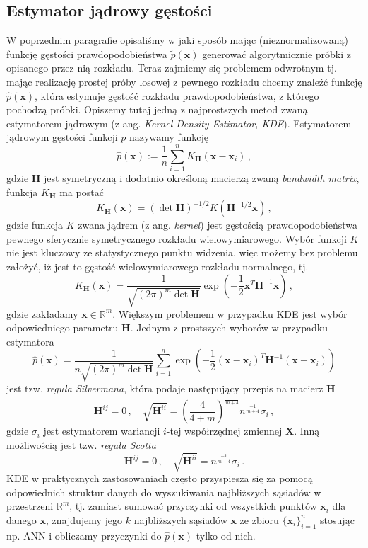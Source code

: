 \documentclass{myclass}
\numberwithin{equation}{subsection}
\begin{document}
\subsection{Estymator jądrowy gęstości}

W poprzednim paragrafie opisaliśmy w jaki sposób mając (nieznormalizowaną) funkcję gęstości
prawdopodobieństwa \(\tilde{p}(\bm{x})\) generować algorytmicznie próbki z opisanego przez nią
rozkładu. Teraz zajmiemy się problemem odwrotnym tj. mając realizację prostej próby losowej z
pewnego rozkładu chcemy znaleźć funkcję \(\hat{p}(\bm{x})\), która estymuje gęstość rozkładu
prawdopodobieństwa, z którego pochodzą próbki. Opiszemy tutaj jedną z najprostszych metod zwaną
estymatorem jądrowym (z ang. \textit{Kernel Density Estimator, KDE}). Estymatorem jądrowym gęstości
funkcji \(p\) nazywamy funkcję
\[
\hat{p}(\bm{x}) := \frac{1}{n}\sum_{i=1}^n K_{\bm{H}}(\bm{x} - \bm{x}_i)\,,
\]
gdzie \(\bm{H}\) jest symetryczną i dodatnio określoną macierzą zwaną \textit{bandwidth matrix},
funkcja \(K_{\bm{H}}\) ma postać
\[
K_{\bm{H}}(\bm{x}) = (\det \bm{H})^{-1/2} K(\bm{H}^{-1/2}\bm{x})\,,
\]
gdzie funkcja \(K\) zwana jądrem (z ang. \textit{kernel}) jest gęstością prawdopodobieństwa pewnego
sferycznie symetrycznego rozkładu wielowymiarowego. Wybór funkcji \(K\) nie jest kluczowy ze
statystycznego punktu widzenia, więc możemy bez problemu założyć, iż jest to gęstość
wielowymiarowego rozkładu normalnego, tj.
\[
K_{\bm{H}}(\bm{x}) = \frac{1}{\sqrt{(2\pi)^m \det\bm{H}}} \exp\left(-\frac{1}{2} \bm{x}^T\bm{H}^{-1}\bm{x}\right)\,,
\]
gdzie zakładamy \(\bm{x} \in \mathbb{R}^m\). Większym problemem w przypadku KDE jest wybór
odpowiedniego parametru \(\bm{H}\). Jednym z prostszych wyborów w przypadku estymatora
\[
\boxed{
\hat{p}(\bm{x}) = \frac{1}{n\sqrt{(2\pi)^m \det\bm{H}}} \sum_{i=1}^n \exp\left(-\frac{1}{2} (\bm{x} - \bm{x}_i)^T\bm{H}^{-1}(\bm{x} - \bm{x}_i)\right)
}
\]
jest tzw. \emph{reguła Silvermana}, która podaje następujący przepis na macierz \(\bm{H}\)
\[
\bm{H}^{ij} = 0\,,\quad \sqrt{\bm{H}^{ii}} = \left(\frac{4}{4 + m}\right)^\frac{1}{m + 4} n^\frac{-1}{m + 4} \sigma_i\,,
\] 
gdzie \(\sigma_i\) jest estymatorem wariancji \(i\)-tej współrzędnej zmiennej \(\bm{X}\). Inną
możliwością jest tzw. \emph{reguła Scotta}
\[
\bm{H}^{ij} = 0\,,\quad \sqrt{\bm{H}^{ii}} = n^\frac{-1}{m+4} \sigma_i\,.
\]
KDE w praktycznych zastosowaniach często przyspiesza się za pomocą odpowiednich struktur danych do
wyszukiwania najbliższych sąsiadów w przestrzeni \(\mathbb{R}^m\), tj. zamiast sumować przyczynki od
wszystkich punktów \(\bm{x}_i\) dla danego \(\bm{x}\), znajdujemy jego \(k\) najbliższych sąsiadów
\(\bm{x}\) ze zbioru \(\{\bm{x}_i\}_{i=1}^n\) stosując np. ANN i obliczamy przyczynki do
\(\hat{p}(\bm{x})\) tylko od nich.
\end{document}
